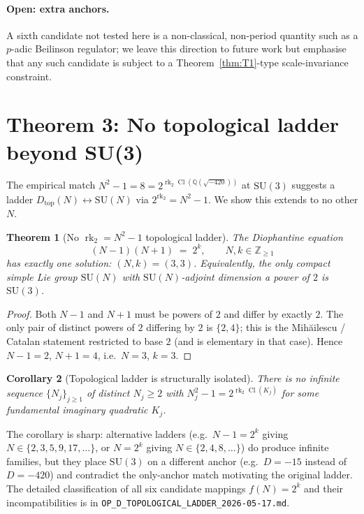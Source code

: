 \documentclass[aps,prl,reprint,superscriptaddress,floatfix,nofootinbib,amssymb]{revtex4-2}
\newtheorem{theorem}{Theorem}
\newtheorem{corollary}[theorem]{Corollary}
\theoremstyle{definition}
\theoremstyle{remark}
\DeclareMathOperator{\Cl}{Cl}
\DeclareMathOperator{\rk}{rk}
\newcommand{\Q}{\mathbb{Q}}
\newcommand{\Z}{\mathbb{Z}}
\begin{document}
\paragraph{Open: extra anchors.}
A sixth candidate not tested here is a non-classical, non-period
quantity such as a $p$-adic Beilinson regulator; we leave this
direction to future work but emphasise that any such candidate is
subject to a Theorem~\ref{thm:T1}-type scale-invariance constraint.

\section{Theorem 3: No topological ladder beyond
SU(3)}\label{sec:T3}

The empirical match $N^2-1 = 8 = 2^{\rk_2 \Cl(\Q(\sqrt{-420}))}$ at
$\mathrm{SU}(3)$ suggests a ladder
$D_{\mathrm{top}}(N) \leftrightarrow \mathrm{SU}(N)$ via
$2^{\rk_2} = N^2-1$. We show this extends to no other $N$.

\begin{theorem}[No $\rk_2 = N^2-1$ topological ladder]\label{thm:T3}
The Diophantine equation
\begin{equation}\label{eq:Catalan}
(N-1)(N+1) \;=\; 2^k, \qquad N,k \in \Z_{\ge 1}
\end{equation}
has exactly one solution: $(N,k) = (3,3)$. Equivalently, the only
compact simple Lie group $\mathrm{SU}(N)$ with $\mathrm{SU}(N)$-adjoint
dimension a power of $2$ is $\mathrm{SU}(3)$.
\end{theorem}

\begin{proof}
Both $N-1$ and $N+1$ must be powers of $2$ and differ by exactly $2$.
The only pair of distinct powers of $2$ differing by $2$ is
$\{2,4\}$; this is the Mih\u{a}ilescu / Catalan statement
\cite{Mihailescu2004} restricted to base $2$ (and is elementary in
that case). Hence $N-1=2$, $N+1=4$, i.e.\ $N=3$, $k=3$. \qedhere
\end{proof}

\begin{corollary}[Topological ladder is structurally isolated]
\label{cor:T3}
There is no infinite sequence $\{N_j\}_{j\ge 1}$ of distinct $N_j \ge
2$ with $N_j^2 - 1 = 2^{\rk_2 \Cl(K_j)}$ for some fundamental
imaginary quadratic $K_j$.
\end{corollary}

The corollary is sharp: alternative ladders (e.g.\ $N-1 = 2^k$ giving
$N \in \{2,3,5,9,17,\ldots\}$, or $N=2^k$ giving $N\in\{2,4,8,\ldots\}$)
do produce infinite families, but they place $\mathrm{SU}(3)$ on a
different anchor (e.g.\ $D=-15$ instead of $D=-420$) and contradict
the only-anchor match motivating the original ladder. The detailed
classification of all six candidate mappings $f(N) = 2^k$ and their
incompatibilities is in
\texttt{OP\_D\_TOPOLOGICAL\_LADDER\_2026-05-17.md}.
\end{document}
